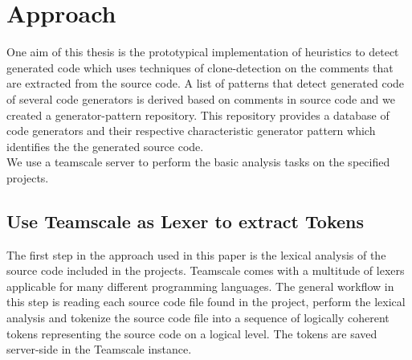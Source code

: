 
\chapter{Approach}\label{chapter:approach}
One aim of this thesis is the prototypical implementation of heuristics to detect generated code which uses techniques of clone-detection on the comments that are extracted from the source code. A list of patterns that detect generated code of several code generators is derived based on comments in source code and we created a generator-pattern repository. This repository provides a database of code generators and their respective characteristic generator pattern which identifies the the generated source code.\\
We use a teamscale server to perform the basic analysis tasks on the specified projects.
\section{Use Teamscale as Lexer to extract Tokens}
The first step in the approach used in this paper is the lexical analysis of the source code included in the projects. Teamscale comes with a multitude of lexers applicable for many different programming languages. The general workflow in this step is reading each source code file found in the project, perform the lexical analysis and tokenize the source code file into a sequence of logically coherent tokens representing the source code on a logical level. The tokens are saved server-side in the Teamscale instance.


